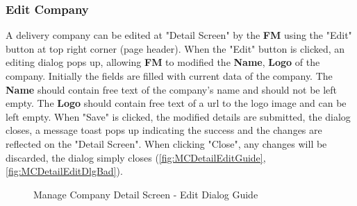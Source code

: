 \subsubsection{Edit Company}

A delivery company can be edited at "Detail Screen" by the \textbf{FM} using the "Edit" button at top right corner (page header). 
When the "Edit" button is clicked, an editing dialog pops up, allowing \textbf{FM} to modified the \textbf{Name}, \textbf{Logo} of the company. Initially the fields are filled with current data of the company. The \textbf{Name} should contain free text of the company's name and should not be left empty. The \textbf{Logo} should contain free text of a url to the logo image and can be left empty.
When "Save" is clicked, the modified details are submitted, the dialog closes, a message toast pops up indicating the success and the changes are reflected on the "Detail Screen". When clicking "Close", any changes will be discarded, the dialog simply closes (\autoref{fig:MCDetailEditGuide}, \autoref{fig:MCDetailEditDlgBad}). 

\begin{figure}[H]
	\centering
    \vspace{5pt}
    \hspace{5pt}
    \caption{Manage Company Detail Screen - Edit Dialog Guide}
	\label{fig:MCDetailEditGuide}
\end{figure}

